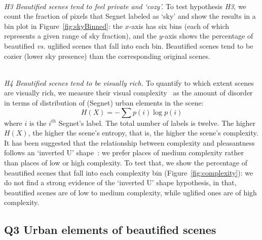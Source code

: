 \mbox{ } \\
\noindent
\emph{H3 Beautified scenes tend to feel private and `cozy'.}
To  test hypothesis \emph{H3}, we count the fraction of pixels that Segnet labeled  as `sky' and show the results in a bin plot in Figure~\ref{fig:skyBinned}:  the $x$-axis has six bins (each of which represents a given range of sky fraction), and the $y$-axis shows the percentage of beautified \emph{vs.} uglified scenes that fall into each bin.  Beautified scenes tend to be cozier (lower sky presence) than the corresponding original scenes.


\mbox{ } \\
\noindent
\emph{H4 Beautified scenes tend to be visually rich.}
To quantify to which extent scenes are visually rich, we measure their visual complexity~\cite{ewing2013measuring} as  the amount of disorder in terms of distribution of (Segnet) urban elements in the scene: 
\begin{equation}
H(X) = -\sum p(i)\log p(i)
\label{eq:entropy} 
\end{equation}
where $i$ is the $i^{th}$ Segnet's label. The total number of labels is twelve. The higher $H(X)$, the  higher the scene's entropy, that is, the higher the scene's complexity. It has been suggested that the relationship between complexity and  pleasantness follows an `inverted U' shape~\cite{ulrich1983aesthetic}: we prefer places of medium complexity rather than places of low or high complexity. To test that, we show the percentage of beautified scenes that fall into each complexity bin  (Figure~\ref{fig:complexity}):  we do not find a strong evidence of the `inverted U' shape hypothesis, in that, beautified scenes are of low to medium complexity, while uglified ones are of high complexity.



\subsection*{Q3 Urban elements of beautified scenes}


